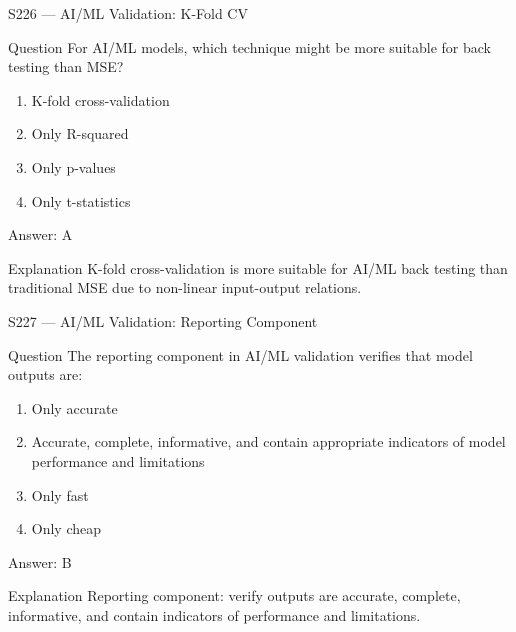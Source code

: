 \documentclass[aspectratio=169,8pt]{beamer}
\begin{document}
\begin{frame}{S226 --- AI/ML Validation: K-Fold CV}
	\begin{block}{Question}
		For AI/ML models, which technique might be more suitable for back testing than MSE?
		\begin{enumerate}
			\item K-fold cross-validation
			\item Only R-squared
			\item Only p-values
			\item Only t-statistics
		\end{enumerate}
	\end{block}
	\begin{exampleblock}{Answer: A}\end{exampleblock}
	\begin{block}{Explanation}
		K-fold cross-validation is more suitable for AI/ML back testing than traditional MSE due to non-linear input-output relations.
	\end{block}
\end{frame}

\begin{frame}{S227 --- AI/ML Validation: Reporting Component}
	\begin{block}{Question}
		The reporting component in AI/ML validation verifies that model outputs are:
		\begin{enumerate}
			\item Only accurate
			\item Accurate, complete, informative, and contain appropriate indicators of model performance and limitations
			\item Only fast
			\item Only cheap
		\end{enumerate}
	\end{block}
	\begin{exampleblock}{Answer: B}\end{exampleblock}
	\begin{block}{Explanation}
		Reporting component: verify outputs are accurate, complete, informative, and contain indicators of performance and limitations.
	\end{block}
\end{frame}
\end{document}
